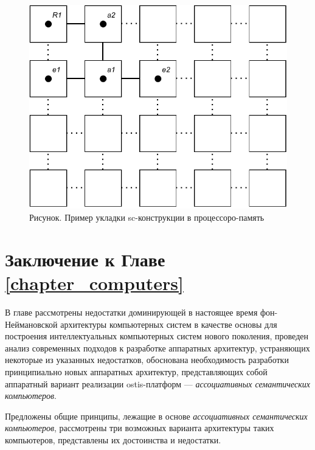 \begin{figure}[H]
	\includegraphics[scale=1]{images/part6/chapter_computer/fine-grained architecture.pdf}
	\caption{Рисунок. Пример укладки sc-конструкции в процессоро-память}
	\label{fig:fine-grained-architecture}
\end{figure}

\section*{Заключение к Главе \ref{chapter_computers}}
В главе рассмотрены недостатки доминирующей в настоящее время фон-Неймановской архитектуры компьютерных систем в качестве основы для построения интеллектуальных компьютерных систем нового поколения, проведен анализ современных подходов к разработке аппаратных архитектур, устраняющих некоторые из указанных недостатков, обоснована необходимость разработки принципиально новых аппаратных архитектур, представляющих собой аппаратный вариант реализации ostis-платформ --- \textit{ассоциативных семантических компьютеров}.

Предложены общие принципы, лежащие в основе \textit{ассоциативных семантических компьютеров}, рассмотрены три возможных варианта архитектуры таких компьютеров, представлены их достоинства и недостатки.

